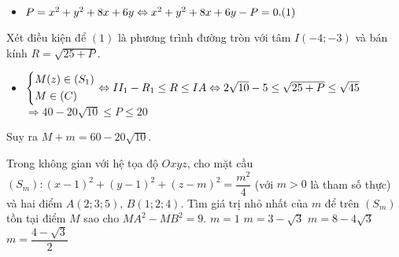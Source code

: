 \begin{ex}
{\begin{itemize}
	\item $P=x^2+y^2+8x+6y\Leftrightarrow x^2+y^2+8x+6y-P=0.\hfill (1)$
	\end{itemize}
	Xét điều kiện để $(1)$ là phương trình đường tròn với tâm $I(-4;-3)$ và bán kính $R=\sqrt{25+P}$.
	\begin{itemize}
	\item $\left\{\begin{aligned}&M(z)\in (S_1)\\&M\in (C)\end{aligned}\right.\Leftrightarrow II_1-R_1\le R\le IA\Leftrightarrow 2\sqrt{10}-5\le \sqrt{25+P}\le \sqrt{45}$\\$\Rightarrow 40-20\sqrt{10}\le P\le 20$
	\end{itemize}
Suy ra $M+m=60-20\sqrt{10}.$		
	}
\end{ex}

\begin{ex}%
Trong không gian với hệ tọa độ $Oxyz$, cho mặt cầu $(S_m)\colon (x-1)^2+(y-1)^2+(z-m)^2=\dfrac{m^2}{4}$ (với $m>0$ là tham số thực) và hai điểm $A(2;3;5),\,B(1;2;4)$. Tìm giá trị nhỏ nhất của $m$ để trên $(S_m)$ tồn tại điểm $M$ sao cho $MA^2-MB^2=9$.
	\choice
	{$m=1$}
	{$m=3-\sqrt{3}$}
	{\True $m=8-4\sqrt{3}$}
	{$m=\dfrac{4-\sqrt{3}}{2}$}
\end{ex}

